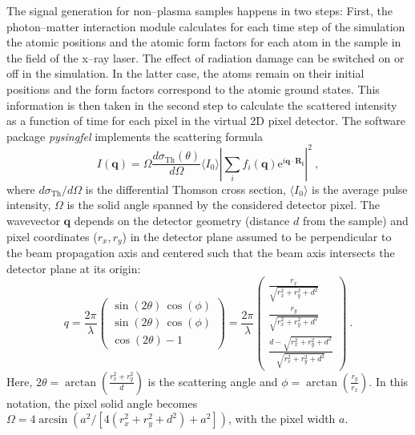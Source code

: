 \documentclass[10pt]{scrartcl}
\begin{document}
The signal generation for non--plasma samples happens in two steps: First, the
photon--matter interaction module calculates for each time step of the
simulation the atomic positions and the atomic form factors for each
atom in the sample in the field of the x--ray laser. The effect of radiation
damage can be switched on or off in the simulation. In the latter case, the
atoms remain on their initial positions and the form factors correspond to the
atomic ground states.
This information is then
taken in the second step to calculate the scattered intensity as a function of
time for each pixel in the virtual 2D pixel detector. The software package
\textit{pysingfel} \cite{pysingfel_github} implements the scattering formula
\begin{equation}
  I(\mathbf{q}) = \Omega
  \frac{d\sigma_\mathrm{Th}(\theta)}{d\Omega}\langle I_0\rangle\left|
  \sum_i f_i(\mathbf{q})\mathrm{e}^{i\mathbf{q}\cdot\mathbf{R_i}}\right|^2~,
  \label{eqn:scattering_intensity}
\end{equation}
where $d\sigma_\mathrm{Th}/d\Omega$ is the differential Thomson cross
section,
$\langle I_0\rangle$ is the average pulse intensity, $\Omega$ is the solid
angle spanned by the considered detector pixel.
The wavevector $\mathbf{q}$ depends on the detector geometry (distance
$d$ from the sample) and pixel coordinates ($r_x, r_y$) in the detector plane assumed
to be perpendicular to the beam propagation axis and centered such that the
beam axis intersects the detector plane at its origin:
\begin{equation}
  q=\frac{2\pi}{\lambda}\left(%
  \begin{array}{l}
  \sin(2\theta)\,\cos(\phi)\\
  \sin(2\theta)\,\cos(\phi)\\
  \cos(2\theta)-1
  \end{array}%
  \right) =
  \frac{2\pi}{\lambda}\left(%
  \begin{array}{l}
    \frac{r_x}{\sqrt{r_x^2+r_y^2+d^2}}\\
    \frac{r_y}{\sqrt{r_x^2+r_y^2+d^2}}\\
    \frac{d-\sqrt{r_x^2+r_y^2+d^2}}{\sqrt{r_x^2+r_y^2+d^2}}
  \end{array}%
  \right)~.
  \label{eqn:q_components}
\end{equation}
Here, $2\theta=\arctan\left(\frac{r_x^2+r_y^2}{d}\right)$ is the scattering
angle and $\phi=\arctan\left(\frac{r_y}{r_x}\right)$. In this notation, the
pixel solid angle becomes
$\Omega=4\arcsin\left(a^2/\left[ 4(r_x^2+r_y^2+d^2)+a^2 \right]\right)$, with the pixel
width $a$.
\end{document}
